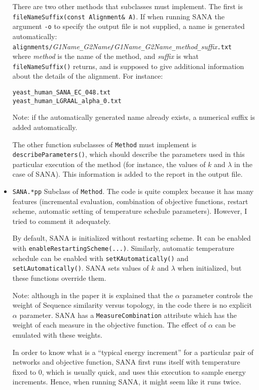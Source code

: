 \documentclass[]{article}
\begin{document}
\begin{itemize}
There are two other methods that subclasses must implement. The first is \texttt{fileNameSuffix(const Alignment\& A)}. If when running SANA the argument \texttt{-o} to specify the output file is not supplied, a name is generated automatically:\\
\texttt{alignments/}\textit{G1Name}\texttt{\_}\textit{G2Name}\texttt{/}\textit{G1Name}\texttt{\_}\textit{G2Name}\texttt{\_}\textit{method}\texttt{\_}\textit{suffix}\texttt{.txt}\\where \textit{method} is the name of the method, and \textit{suffix} is what \texttt{fileNameSuffix()} returns, and is supposed to give additional information about the details of the alignment. For instance:
\begin{verbatim}
yeast_human_SANA_EC_048.txt
yeast_human_LGRAAL_alpha_0.txt
\end{verbatim}
Note: if the automatically generated name already exists, a numerical suffix is added automatically.

The other function subclasses of \texttt{Method} must implement is \texttt{describeParameters()}, which should describe the parameters used in this particular execution of the method (for instance, the values of $k$ and $\lambda$ in the case of SANA). This information is added to the report in the output file.

\item \texttt{SANA.*pp} Subclass of \texttt{Method}. The code is quite complex because it has many features (incremental evaluation, combination of objective functions, restart scheme, automatic setting of temperature schedule parameters). However, I tried to comment it adequately.

By default, SANA is initialized without restarting scheme. It can be enabled with \texttt{enableRestartingScheme(...)}. Similarly, automatic temperature schedule can be enabled with \texttt{setKAutomatically()} and \texttt{setLAutomatically()}. SANA sets values of $k$ and $\lambda$ when initialized, but these functions override them.

Note: although in the paper it is explained that the $\alpha$ parameter controls the weight of Sequence similarity versus topology, in the code there is no explicit $\alpha$ parameter. SANA has a \texttt{MeasureCombination} attribute which has the weight of each measure in the objective function. The effect of $\alpha$ can be emulated with these weights.

In order to know what is a ``typical energy increment'' for a particular pair of networks and objective function, SANA first runs itself with temperature fixed to 0, which is usually quick, and uses this execution to sample energy increments. Hence, when running SANA, it might seem like it runs twice.


\end{itemize}
\end{document}
